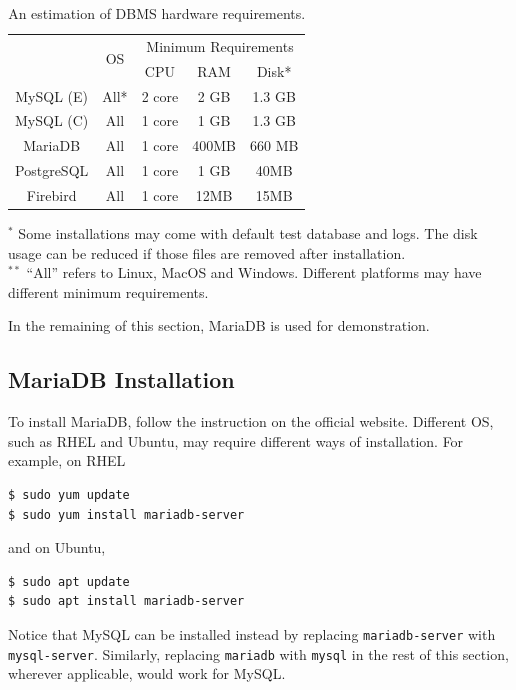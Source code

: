 \begin{table}
	\centering \caption{An estimation of DBMS hardware requirements.} \label{ch:db:tab:rdbrequirements}
	\begin{tabular}{|c|c|c|c|c|}
		\hline
		 & \multirow{2}{*}{OS} & \multicolumn{3}{c|}{Minimum Requirements} \\ \cline{3-5}
		 & & CPU & RAM & Disk* \\ \hline
		 MySQL (E) & All* & 2 core & 2 GB & 1.3 GB \\ \hline
		 MySQL (C) & All & 1 core & 1 GB & 1.3 GB \\ \hline
		 MariaDB & All & 1 core & 400MB & 660 MB \\ \hline
		 PostgreSQL & All & 1 core & 1 GB & 40MB \\ \hline
		 Firebird & All & 1 core & 12MB & 15MB \\ \hline
	\end{tabular}
	\begin{flushleft}
	\footnotesize
	$^{*}$ Some installations may come with default test database and logs. The disk usage can be reduced if those files are removed after installation. \\
	$^{**}$ ``All'' refers to Linux, MacOS and Windows. Different platforms may have different minimum requirements. \\
    \end{flushleft}
\end{table}

In the remaining of this section, MariaDB is used for demonstration.

\subsection{MariaDB Installation}

To install MariaDB, follow the instruction on the official website. Different OS, such as RHEL and Ubuntu, may require different ways of installation. For example, on RHEL
\begin{lstlisting}
$ sudo yum update
$ sudo yum install mariadb-server
\end{lstlisting}
and on Ubuntu,
\begin{lstlisting}
$ sudo apt update
$ sudo apt install mariadb-server
\end{lstlisting}
Notice that MySQL can be installed instead by replacing \verb|mariadb-server| with \verb|mysql-server|. Similarly, replacing \verb|mariadb| with \verb|mysql| in the rest of this section, wherever applicable, would work for MySQL.

